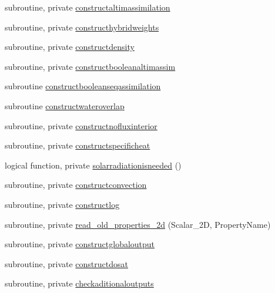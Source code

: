 \begin{DoxyCompactItemize}
subroutine, private \mbox{\hyperlink{namespacemodulewaterproperties_ac1893e82a87294024a1db3f0c2a7a842}{constructaltimassimilation}}
\item 
subroutine, private \mbox{\hyperlink{namespacemodulewaterproperties_a9167d6301bd0853ded33f93fb437a619}{constructhybridweights}}
\item 
subroutine, private \mbox{\hyperlink{namespacemodulewaterproperties_aa61935dbc55b8114ffeef13972cd62b1}{constructdensity}}
\item 
subroutine, private \mbox{\hyperlink{namespacemodulewaterproperties_a48d5c887c475fa7e3e29d35f55262ade}{constructbooleanaltimassim}}
\item 
subroutine \mbox{\hyperlink{namespacemodulewaterproperties_aa5d8008c930a03a6746ab2ae44f44f14}{constructbooleanseqassimilation}}
\item 
subroutine \mbox{\hyperlink{namespacemodulewaterproperties_a1c2eaa3c5cb93a51e2756820277cef75}{constructwateroverlap}}
\item 
subroutine, private \mbox{\hyperlink{namespacemodulewaterproperties_a1cee571ebf44f0252603c9bd29a100e1}{constructnofluxinterior}}
\item 
subroutine, private \mbox{\hyperlink{namespacemodulewaterproperties_a638275f2c0c184e858bd3e3e3e459901}{constructspecificheat}}
\item 
logical function, private \mbox{\hyperlink{namespacemodulewaterproperties_a53711f4b1de0dd2fa6207fc580193db9}{solarradiationisneeded}} ()
\item 
subroutine, private \mbox{\hyperlink{namespacemodulewaterproperties_ad8de5e881e7e755e1d5eaa908ad599eb}{constructconvection}}
\item 
subroutine, private \mbox{\hyperlink{namespacemodulewaterproperties_a9f3f90ee5c2e83e1b90c3d1260a0d307}{constructlog}}
\item 
subroutine, private \mbox{\hyperlink{namespacemodulewaterproperties_a5a69094fb0cfdb28de4d2307ceeb3f84}{read\+\_\+old\+\_\+properties\+\_\+2d}} (Scalar\+\_\+2D, Property\+Name)
\item 
subroutine, private \mbox{\hyperlink{namespacemodulewaterproperties_aef6113e740cce05ecfdab1fee63873df}{constructglobaloutput}}
\item 
subroutine, private \mbox{\hyperlink{namespacemodulewaterproperties_ad828152e0a7f6fd60ca0cd045955a56b}{constructdosat}}
\item 
subroutine, private \mbox{\hyperlink{namespacemodulewaterproperties_aa08d6c50fcab3e8816fe7775bd101952}{checkaditionaloutputs}}

\end{DoxyCompactItemize}
